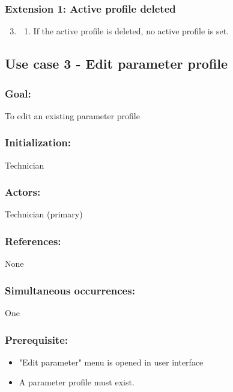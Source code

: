 \begin{framed}
	\subsubsection*{Extension 1: Active profile deleted}
	\begin{enumerate}
		\setcounter{enumi}{2}
		\item 
		\begin{enumerate}
			\item If the active profile is deleted, no active profile is set.
		\end{enumerate}
	\end{enumerate}


\end{framed}



\begin{framed}
\subsection{Use case 3 - Edit parameter profile}
\subsubsection*{Goal:}
To edit an existing parameter profile 

\subsubsection*{Initialization:}
Technician

\subsubsection*{Actors:}
Technician (primary)

\subsubsection*{References:}
None

\subsubsection*{Simultaneous occurrences:}
One

\subsubsection*{Prerequisite:}
\begin{itemize}
	\item "Edit parameter" menu is opened in user interface
	\item A parameter profile must exist.
\end{itemize}



\end{framed}
